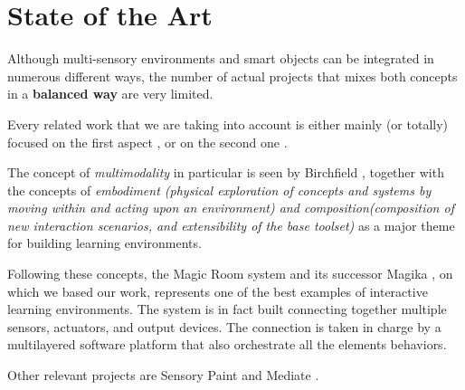 \chapter{State of the Art}

Although multi-sensory environments and smart objects can be integrated in numerous different ways, the number of actual projects that mixes both concepts in a \textbf{balanced way} are very limited. 

Every related work that we are taking into account is either mainly (or totally) focused on the first aspect \cite{mora-guiard_lands_2016}\cite{ringland_sensorypaint:_2014}\cite{pares_promotion_2005}, or on the second one  \cite{yao_rope_2011}.

The concept of \textit{multimodality} in particular is seen by Birchfield \cite{birchfield_embodiment_2008}, together with the concepts of \textit{embodiment (physical exploration of concepts and systems by moving within and acting upon an environment) and composition(composition of new interaction scenarios, and extensibility of the base toolset)} as a major theme for building learning environments. 

Following these concepts, the Magic Room system \cite{garzotto_magic_2018} and its successor Magika \cite{gelsomini_magika_2019}, on which we based our work, represents one of the best examples of interactive learning environments. The system is in fact built connecting together multiple sensors, actuators, and output devices. 
The connection is taken in charge by a multilayered software platform that also orchestrate all the elements behaviors.

Other relevant projects are Sensory Paint \cite{ringland_sensorypaint:_2014} and Mediate \cite{pares_promotion_2005}.

